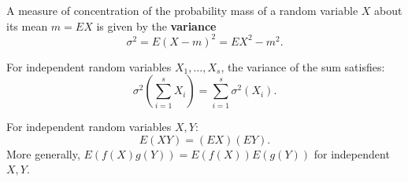 A measure of concentration of the probability mass of a random variable $X$ about its mean $m = EX$ is given by the \textbf{variance}
$$\sigma^2 = E(X - m)^2 = EX^2 - m^2.$$

For independent random variables $X_1, \dots, X_s$, the variance of the sum satisfies:
$$\sigma^2\left(\sum_{i=1}^{s} X_i\right) = \sum_{i=1}^{s} \sigma^2(X_i).$$

For independent random variables $X, Y$:
$$E(XY) = (EX)(EY).$$
More generally, $E(f(X)g(Y)) = E(f(X)) E(g(Y))$ for independent $X, Y$.
